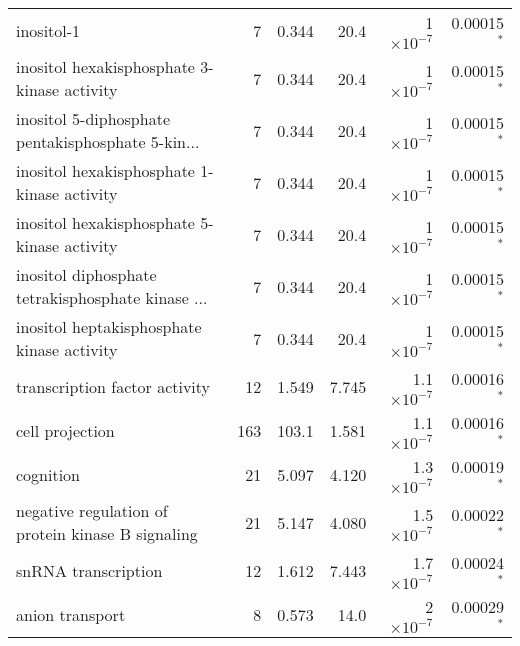 \begin{longtable}{|l|r|r|r|r|r|}
                                        inositol-1 &                       7 &                   0.344 &       20.4 &    1$\times 10^{-7}$ &               0.00015$\bm{^*}$ \\
       inositol hexakisphosphate 3-kinase activity &                       7 &                   0.344 &       20.4 &    1$\times 10^{-7}$ &               0.00015$\bm{^*}$ \\
 inositol 5-diphosphate pentakisphosphate 5-kin... &                       7 &                   0.344 &       20.4 &    1$\times 10^{-7}$ &               0.00015$\bm{^*}$ \\
       inositol hexakisphosphate 1-kinase activity &                       7 &                   0.344 &       20.4 &    1$\times 10^{-7}$ &               0.00015$\bm{^*}$ \\
       inositol hexakisphosphate 5-kinase activity &                       7 &                   0.344 &       20.4 &    1$\times 10^{-7}$ &               0.00015$\bm{^*}$ \\
 inositol diphosphate tetrakisphosphate kinase ... &                       7 &                   0.344 &       20.4 &    1$\times 10^{-7}$ &               0.00015$\bm{^*}$ \\
        inositol heptakisphosphate kinase activity &                       7 &                   0.344 &       20.4 &    1$\times 10^{-7}$ &               0.00015$\bm{^*}$ \\
                     transcription factor activity &                      12 &                   1.549 &      7.745 &  1.1$\times 10^{-7}$ &               0.00016$\bm{^*}$ \\
                                   cell projection &                     163 &                   103.1 &      1.581 &  1.1$\times 10^{-7}$ &               0.00016$\bm{^*}$ \\
                                         cognition &                      21 &                   5.097 &      4.120 &  1.3$\times 10^{-7}$ &               0.00019$\bm{^*}$ \\
 negative regulation of protein kinase B signaling &                      21 &                   5.147 &      4.080 &  1.5$\times 10^{-7}$ &               0.00022$\bm{^*}$ \\
                               snRNA transcription &                      12 &                   1.612 &      7.443 &  1.7$\times 10^{-7}$ &               0.00024$\bm{^*}$ \\
                                   anion transport &                       8 &                   0.573 &       14.0 &    2$\times 10^{-7}$ &               0.00029$\bm{^*}$ \\

\end{longtable}
